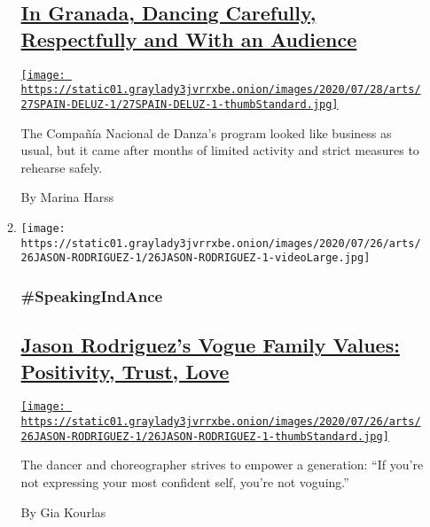 \begin{enumerate}
\begin{enumerate}
    \hypertarget{in-granada-dancing-carefully-respectfully-and-with-an-audience}{%
    \subsection{\texorpdfstring{\href{/2020/07/27/arts/dance/granada-festival-compania-nacional-de-danza.html}{In
    Granada, Dancing Carefully, Respectfully and With an
    Audience}}{In Granada, Dancing Carefully, Respectfully and With an Audience}}\label{in-granada-dancing-carefully-respectfully-and-with-an-audience}}

    \href{/2020/07/27/arts/dance/granada-festival-compania-nacional-de-danza.html}{\texttt{[image: https://static01.graylady3jvrrxbe.onion/images/2020/07/28/arts/27SPAIN-DELUZ-1/27SPAIN-DELUZ-1-thumbStandard.jpg]}}

    The Compañía Nacional de Danza's program looked like business as
    usual, but it came after months of limited activity and strict
    measures to rehearse safely.

    By Marina Harss
  \item
    \texttt{[image: https://static01.graylady3jvrrxbe.onion/images/2020/07/26/arts/26JASON-RODRIGUEZ-1/26JASON-RODRIGUEZ-1-videoLarge.jpg]}

    \hypertarget{speakingindance}{%
    \subsubsection{\#SpeakingIndAnce}\label{speakingindance}}

    \hypertarget{jason-rodriguezs-vogue-family-values-positivity-trust-love}{%
    \subsection{\texorpdfstring{\href{/2020/07/24/arts/dance/jason-rodriguez-vogue-pose.html}{Jason
    Rodriguez's Vogue Family Values: Positivity, Trust,
    Love}}{Jason Rodriguez's Vogue Family Values: Positivity, Trust, Love}}\label{jason-rodriguezs-vogue-family-values-positivity-trust-love}}

    \href{/2020/07/24/arts/dance/jason-rodriguez-vogue-pose.html}{\texttt{[image: https://static01.graylady3jvrrxbe.onion/images/2020/07/26/arts/26JASON-RODRIGUEZ-1/26JASON-RODRIGUEZ-1-thumbStandard.jpg]}}

    The dancer and choreographer strives to empower a generation: ``If
    you're not expressing your most confident self, you're not
    voguing.''

    By Gia Kourlas
  \end{enumerate}
\end{enumerate}

